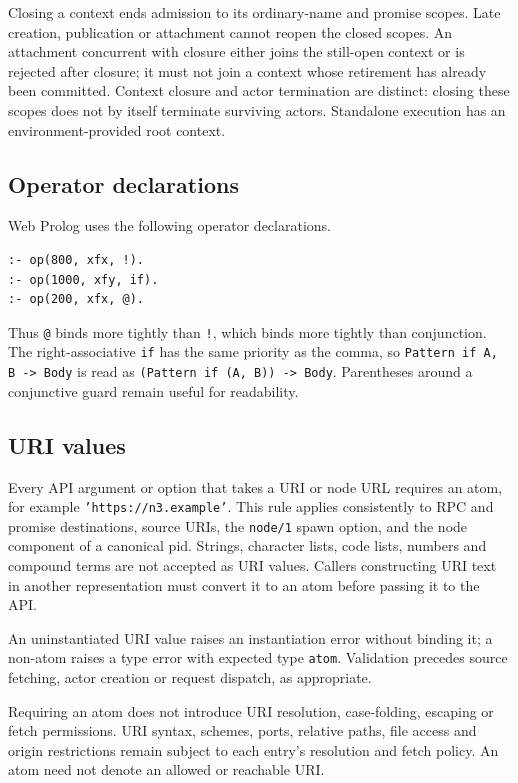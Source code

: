 Closing a context ends admission to its ordinary-name and promise scopes.
Late creation, publication or attachment cannot reopen the closed scopes.
An attachment concurrent with closure either joins the still-open context or
is rejected after closure; it must not join a context whose retirement has
already been committed. Context closure and actor termination are distinct:
closing these scopes does not by itself terminate surviving actors.
Standalone execution has an environment-provided root context.

\subsection{Operator declarations}\label{sec:manual-operator-declarations}
Web Prolog uses the following operator declarations.

\begin{verbatim}
:- op(800, xfx, !).
:- op(1000, xfy, if).
:- op(200, xfx, @).
\end{verbatim}

\noindent Thus \texttt{@} binds more tightly than \texttt{!}, which binds
more tightly than conjunction. The right-associative \texttt{if} has the
same priority as the comma, so
\texttt{Pattern\,if A,\,B\,->\,Body} is read as
\texttt{(Pattern\,if\,(A,\,B))\,->\,Body}. Parentheses around a conjunctive guard
remain useful for readability.

\subsection{URI values}\label{sec:manual-uri-values}
Every API argument or option that takes a URI or node URL requires an atom,
for example \texttt{'https://n3.example'}. This rule applies consistently to
RPC and promise destinations, source URIs, the \texttt{node/1} spawn option,
and the node component of a canonical pid. Strings, character lists, code
lists, numbers and compound terms are not accepted as URI values. Callers
constructing URI text in another representation must convert it to an atom
before passing it to the API.

An uninstantiated URI value raises an instantiation error without binding it;
a non-atom raises a type error with expected type \texttt{atom}. Validation
precedes source fetching, actor creation or request dispatch, as appropriate.

Requiring an atom does not introduce URI resolution, case-folding, escaping
or fetch permissions. URI syntax, schemes, ports, relative paths, file access
and origin restrictions remain subject to each entry's resolution and fetch
policy. An atom need not denote an allowed or reachable URI.

